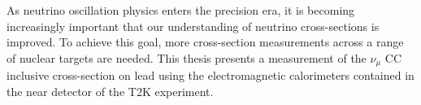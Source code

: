 \newline
\newline
As neutrino oscillation physics enters the precision era, it is becoming increasingly important that our understanding of neutrino cross-sections is improved.  To achieve this goal, more cross-section measurements across a range of nuclear targets are needed.  This thesis presents a measurement of the $\nu_\mu$ CC inclusive cross-section on lead using the electromagnetic calorimeters contained in the near detector of the T2K experiment.  









